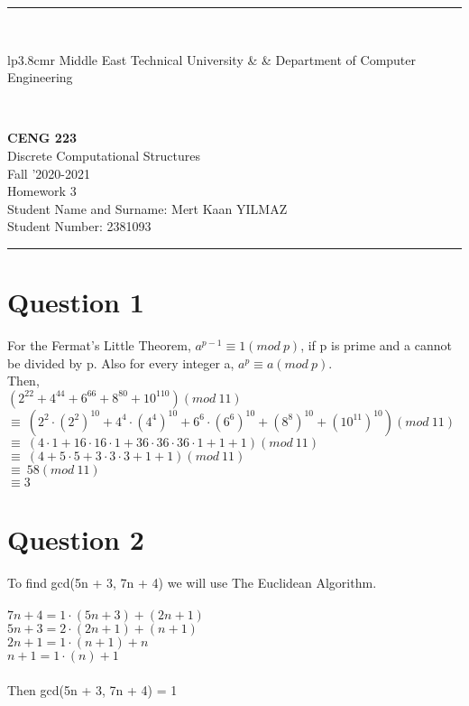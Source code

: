 \documentclass[12pt]{article}
\newcommand{\HRule}{\rule{\linewidth}{1mm}}
\begin{document}
\noindent
\HRule \\[3mm]
\small
\begin{tabular}[b]{lp{3.8cm}r}
{} Middle East Technical University &  &
{} Department of Computer Engineering \\
\end{tabular} \\
\begin{center}

                 \LARGE \textbf{CENG 223} \\[4mm]
                 \Large Discrete Computational Structures \\[4mm]
                \normalsize Fall '2020-2021 \\
                    \Large Homework 3 \\
                \normalsize Student Name and Surname:  Mert Kaan YILMAZ\\
                \normalsize Student Number:  2381093\\
\end{center}
\HRule


\section*{Question 1}
For the Fermat's Little Theorem, $a^{p-1}\equiv 1(mod\:p)$, if p is prime and a cannot be divided by p. Also for every integer a, $a^p\equiv a(mod\:p)$.\\
Then,\\
$(2^{22}+4^{44}+6^{66}+8^{80}+10^{110})(mod\:11)$\\
$\equiv\:(2^2\cdot(2^2)^{10}+4^4\cdot(4^4)^{10}+6^6\cdot(6^6)^{10}+(8^8)^{10}+(10^{11})^{10})(mod\:11)$\\
$\equiv\:(4\cdot1+16\cdot16\cdot1+36\cdot36\cdot36\cdot1+1+1)(mod\:11)$\\
$\equiv\:(4+5\cdot5+3\cdot3\cdot3+1+1)(mod\:11)$\\
$\equiv\:58(mod\:11)$\\
$\equiv 3$

\section*{Question 2}
To find gcd(5n + 3, 7n + 4) we will use The Euclidean Algorithm.\\\\
$7n+4 = 1\cdot(5n+3)+(2n+1)$\\
$5n+3 = 2\cdot(2n+1)+(n+1)$\\
$2n+1 = 1\cdot(n+1)+n$\\
$n+1 = 1\cdot(n)+1$\\\\
Then gcd(5n + 3, 7n + 4) = 1
\newpage
\end{document}
